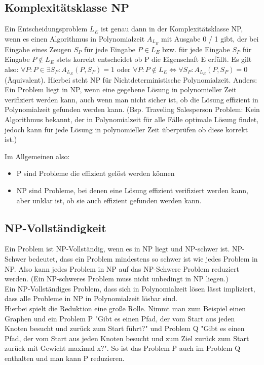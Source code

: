 \documentclass[
../AuD-Zusammenfassung.tex,
]
{subfiles}
\begin{document}
\subsection{Komplexitätsklasse NP}
Ein Entscheidungsproblem $L_E$ ist genau dann in der Komplexitätsklasse NP, wenn es einen Algorithmus in Polynomialzeit $A_{L_E}$ mit Ausgabe 0 / 1 gibt, der bei Eingabe eines Zeugen $S_P$ für jede Eingabe $P \in L_E$ bzw. für jede Eingabe $S_P$ für Eingabe $P \notin L_E$ stets korrekt entscheidet ob P die Eigenschaft E erfüllt. Es gilt also: $\forall P: P \in \exists S_P: A_{L_E}(P, S_P) = 1 $ oder $\forall P: P \notin L_E \Leftrightarrow \forall S_P: A_{L_E}(P, S_P) = 0$ (Äquivalent).
Hierbei steht NP für Nichtdeterministische Polynomialzeit.
Anders: Ein Problem liegt in NP, wenn eine gegebene Lösung in polynomieller Zeit verifiziert werden kann, auch wenn man nicht sicher ist, ob die Lösung effizient in Polynomialzeit gefunden werden kann. (Bsp. Traveling Salesperson Problem: Kein Algorithmus bekannt, der in Polynomialzeit für alle Fälle optimale Lösung findet, jedoch kann für jede Lösung in polynomieller Zeit überprüfen ob diese korrekt ist.)

Im Allgemeinen also:
\begin{itemize}
    \item P sind Probleme die effizient gelöst werden können
    \item NP sind Probleme, bei denen eine Lösung effizient verifiziert werden kann, aber unklar ist, ob sie auch effizient gefunden werden kann.
\end{itemize}

\subsection{NP-Vollständigkeit}
Ein Problem ist NP-Vollständig, wenn es in NP liegt und NP-schwer ist. NP-Schwer bedeutet, dass ein Problem mindestens so schwer ist wie jedes Problem in NP. Also kann jedes Problem in NP auf das NP-Schwere Problem reduziert werden. (Ein NP-schweres Problem muss nicht unbedingt in NP liegen.)\\
Ein NP-Vollständiges Problem, dass sich in Polynomialzeit lösen lässt impliziert, dass alle Probleme in NP in Polynomialzeit lösbar sind.\\

Hierbei spielt die Reduktion eine große Rolle. Nimmt man zum Beispiel einen Graphen und ein Problem P "Gibt es einen Pfad, der vom Start aus jeden Knoten besucht und zurück zum Start führt?" und Problem Q "Gibt es einen Pfad, der vom Start aus jeden Knoten besucht und zum Ziel zurück zum Start zurück mit Gewicht maximal x?". So ist das Problem P auch im Problem Q enthalten und man kann P reduzieren.

\end{document}
